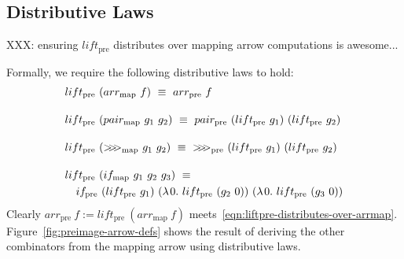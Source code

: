 \documentclass[preprint]{sigplanconf}
\newcommand{\arrowlift}{\ensuremath{lift}}
\newcommand{\arrowarr}{\ensuremath{arr}}
\newcommand{\arrowcomp}{\ensuremath{{>}\mspace{-6mu}{>}\mspace{-6mu}{>}}}
\newcommand{\arrowpair}{\ensuremath{pair}}
\newcommand{\arrowif}{\ensuremath{if}}
\newcommand{\map}{_\mathrm{map}}
\newcommand{\arrmap}{\arrowarr\map}
\newcommand{\compmap}{\arrowcomp\map}
\newcommand{\pairmap}{\arrowpair\map}
\newcommand{\ifmap}{\arrowif\map}
\newcommand{\pre}{_\mathrm{pre}}
\newcommand{\liftpre}{\arrowlift\pre}
\newcommand{\arrpre}{\arrowarr\pre}
\newcommand{\comppre}{\arrowcomp\pre}
\newcommand{\pairpre}{\arrowpair\pre}
\newcommand{\ifpre}{\arrowif\pre}
\begin{document}
\subsection{Distributive Laws}

XXX: ensuring $\liftpre$ distributes over mapping arrow computations is awesome...

Formally, we require the following distributive laws to hold:
\begin{align}
	&\begin{aligned}
		\liftpre~(\arrmap~f) \ \equiv \ \arrpre~f
	\label{eqn:liftpre-distributes-over-arrmap}
	\end{aligned} \\
\nonumber \\[-6pt]
	&\begin{aligned}
		\liftpre~(\pairmap~g_1~g_2) \ \equiv \ \pairpre~(\liftpre~g_1)~(\liftpre~g_2)
	\label{eqn:liftpre-distributes-over-pairmap}
	\end{aligned} \\
\nonumber \\[-6pt]
	&\begin{aligned}
		\liftpre~(\compmap~g_1~g_2) \ \equiv \ \comppre~(\liftpre~g_1)~(\liftpre~g_2)
	\label{eqn:liftpre-distributes-over-compmap}
	\end{aligned} \\
\nonumber \\[-6pt]
	&\begin{aligned}
		&\liftpre~(\ifmap~g_1~g_2~g_3) \ \equiv \ \\
		&\tab\ifpre~(\liftpre~g_1)~(\fun{0}{\liftpre~(g_2~0)})~(\fun{0}{\liftpre~(g_3~0)})
	\label{eqn:liftpre-distributes-over-ifmap}
	\end{aligned}
\end{align}
Clearly $\arrpre~f := \liftpre~(\arrmap~f)$ meets~\eqref{eqn:liftpre-distributes-over-arrmap}.
Figure~\ref{fig:preimage-arrow-defs} shows the result of deriving the other combinators from the mapping arrow using distributive laws.
\end{document}
